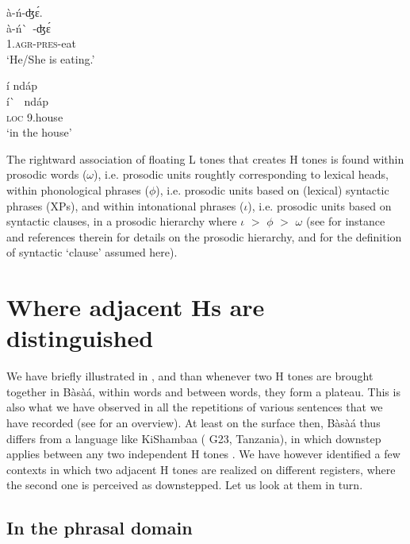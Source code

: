 \documentclass[output=paper,newtxmath,modfonts,nonflat,hidelinks]{langsci/langscibook}
\begin{document}
\ea à-ń-{\↓}ʤ\'ɛ. \label{ex:HamlaouiMakasso:3}\\
\gll à-ń\`~-ʤ\'ɛ\\ 
1.\textsc{agr}-\textsc{pres}-eat\\
\glt `He/She is eating.'
\z


\ea í {\↓}nd{á}p \label{ex:HamlaouiMakasso:4} \\
 \gll í\`~ nd{á}p\\
\textsc{loc} 9.house\\
\glt `in the house'
\z

\noindent
The rightward association of floating L tones that creates {\↓}H tones is found within prosodic words ($\omega$), i.e. prosodic units roughtly corresponding to lexical heads, within phonological phrases ($\phi$), i.e. prosodic units based on (lexical) syntactic phrases (XPs), and within intonational phrases ($\iota$), i.e. prosodic units based on syntactic clauses, in a prosodic hierarchy where $\iota$ $>$ $\phi$ $>$ $\omega$ (see for instance \citet{Selkirk11} and references therein for details on the prosodic hierarchy, and \citet{HamlaouiSzendroi15, HamlaouiSzendroi16} for the definition of syntactic `clause' assumed here).


\section{Where adjacent Hs are distinguished}\label{sec:HamlaouiMakasso:3} 

We have briefly illustrated in ,  and  than whenever two H tones are brought together in Bàsà{á}, within words and between words, they form a plateau. This is also what we have observed in all the repetitions of various sentences that we have recorded (see \citet{MakassoEtAl17} for an overview). At least on the surface then, Bàsà{á} thus differs from a language like KiShambaa ( G23, Tanzania), in which downstep applies between any two independent H tones \citep{Odden82}. We have however identified a few contexts in which two adjacent H tones are realized on different registers, where the second one is perceived as downstepped. Let us look at them in turn.



\subsection{In the phrasal domain}
\end{document}
